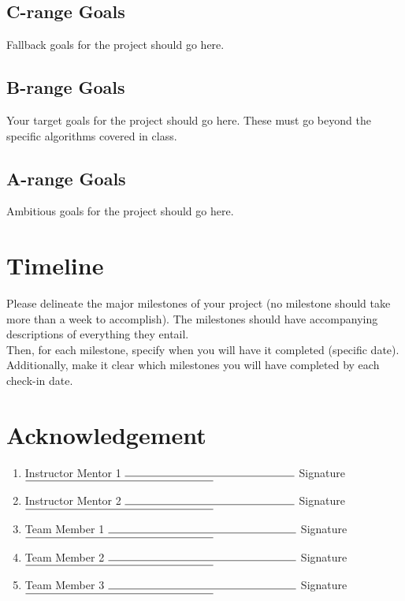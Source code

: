 \documentclass[]{article}
\begin{document}
\subsection{C-range Goals}

Fallback goals for the project should go here.

\subsection{B-range Goals}

Your target goals for the project should go here. These must go beyond the specific algorithms covered in class.

\subsection{A-range Goals}

Ambitious goals for the project should go here.


\section*{Timeline}
Please delineate the major milestones of your project (no milestone should take more than a week to accomplish). The milestones should have accompanying descriptions of everything they entail.\\

Then, for each milestone, specify when you will have it completed (specific date). Additionally, make it clear which milestones you will have completed by each check-in date.

\section*{Acknowledgement}

\begin{enumerate}[wide,labelwidth=!,labelindent=0pt]
	\vspace{1cm}
	\item[] Instructor Mentor 1 $\rule{5.4cm}{0.15mm}$ \qquad Signature $\rule{6cm}{0.15mm}$ 
	
	\vspace{1cm}
	\item[] Instructor Mentor 2 $\rule{5.4cm}{0.15mm}$ \qquad Signature $\rule{6cm}{0.15mm}$ 
	
	
	\vspace{1cm}
	\item[] Team Member 1 $\rule{6cm}{0.15mm}$ \qquad Signature $\rule{6cm}{0.15mm}$ 
	
	\vspace{1cm}
	\item[] Team Member 2 $\rule{6cm}{0.15mm}$ \qquad Signature $\rule{6cm}{0.15mm}$ 
	
	\vspace{1cm}
	\item[] Team Member 3 $\rule{6cm}{0.15mm}$ \qquad Signature $\rule{6cm}{0.15mm}$ 
	
	
\end{enumerate}
\end{document}
